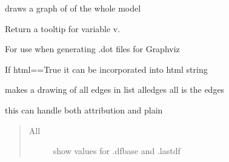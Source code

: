 \documentclass[letterpaper,10pt,english]{sphinxmanual}
\begin{document}
\begin{fulllineitems}

\begin{fulllineitems}
\label{\detokenize{core/modelclass:modelclass.Graph_Draw_Mixin.gdraw}}
\pysigstartsignatures
{}
\pysigstopsignatures
\sphinxAtStartPar
draws a graph of of the whole model

\end{fulllineitems}


\begin{fulllineitems}
\label{\detokenize{core/modelclass:modelclass.Graph_Draw_Mixin.maketip}}
\pysigstartsignatures
{}
\pysigstopsignatures
\sphinxAtStartPar
Return a tooltip for variable v.

\sphinxAtStartPar
For use when generating .dot files for Graphviz

\sphinxAtStartPar
If html==True it can be incorporated into html string

\end{fulllineitems}


\begin{fulllineitems}
\label{\detokenize{core/modelclass:modelclass.Graph_Draw_Mixin.makedotnew}}
\pysigstartsignatures
{}
\pysigstopsignatures
\sphinxAtStartPar
makes a drawing of all edges in list alledges
all is the edges

\sphinxAtStartPar
this can handle both attribution and plain
\begin{quote}\begin{description}
\item[{All}] \leavevmode
\sphinxAtStartPar
show values for .dfbase and .lastdf


\end{description}
\end{quote}
\end{fulllineitems}
\end{fulllineitems}
\end{document}
